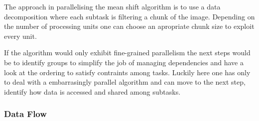 The approach in parallelising the mean shift algorithm is to use a data
decomposition where each subtask is filtering a chunk of the image. Depending on
the number of processing units one can choose an apropriate chunk size to
exploit every unit.

If the algorithm would only exhibit fine-grained parallelism the next steps would
be to identify groups to simplify the job of managing dependencies and have a 
look at the ordering to satisfy contraints among tasks. Luckily here one has only
to deal with a embarrasingly parallel algorithm and can move to the next step, 
identify how data is accessed and shared among subtasks. 

\subsubsection{Data Flow} %
\label{ssub:data_flow}




 

























